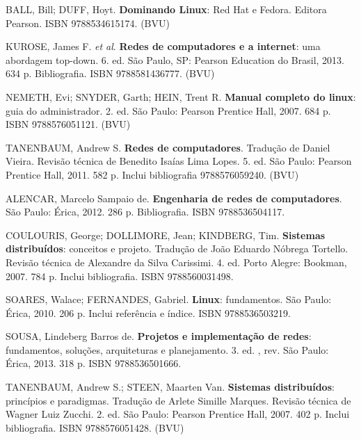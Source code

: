 \begin{pud}
		
	\begin{bibbasica}
		\item BALL, Bill; DUFF, Hoyt. \textbf{Dominando Linux}: Red Hat e Fedora. Editora Pearson. ISBN 9788534615174. (BVU)
		\item KUROSE, James F. \textit{et al}. \textbf{Redes de computadores e a internet}: uma abordagem top-down. 6. ed. São Paulo, SP: Pearson Education do Brasil, 2013. 634 p. Bibliografia. ISBN 9788581436777. (BVU)
		\item NEMETH, Evi; SNYDER, Garth; HEIN, Trent R. \textbf{Manual completo do linux}: guia do administrador. 2. ed. São Paulo: Pearson Prentice Hall, 2007. 684 p. ISBN 9788576051121. (BVU)
		
		\item TANENBAUM, Andrew S. \textbf{Redes de computadores}. Tradução de Daniel Vieira. Revisão técnica de Benedito Isaías Lima Lopes. 5. ed. São Paulo: Pearson Prentice Hall, 2011. 582 p. Inclui bibliografia 9788576059240. (BVU) 

		
	\end{bibbasica}
	
	\begin{bibcomplementar}
	
		\item ALENCAR, Marcelo Sampaio de. \textbf{Engenharia de redes de computadores}. São Paulo: Érica, 2012. 286 p. Bibliografia. ISBN 9788536504117.
		\item COULOURIS, George; DOLLIMORE, Jean; KINDBERG, Tim. \textbf{Sistemas distribuídos}: conceitos e projeto. Tradução de João Eduardo Nóbrega Tortello. Revisão técnica de Alexandre da Silva Carissimi. 4. ed. Porto Alegre: Bookman, 2007. 784 p. Inclui bibliografia. ISBN 9788560031498.
		\item SOARES, Walace; FERNANDES, Gabriel. \textbf{Linux}: fundamentos. São Paulo: Érica, 2010. 206 p. Inclui referência e índice. ISBN 9788536503219.
		\item SOUSA, Lindeberg Barros de. \textbf{Projetos e implementação de redes}: fundamentos, soluções, arquiteturas e planejamento. 3. ed. , rev. São Paulo: Érica, 2013. 318 p. ISBN 9788536501666.		
		\item TANENBAUM, Andrew S.; STEEN, Maarten Van. \textbf{Sistemas distribuídos}: princípios e paradigmas. Tradução de Arlete Simille Marques. Revisão técnica de Wagner Luiz Zucchi. 2. ed. São Paulo: Pearson Prentice Hall, 2007. 402 p. Inclui bibliografia. ISBN 9788576051428. (BVU)

	\end{bibcomplementar}

\end{pud}


